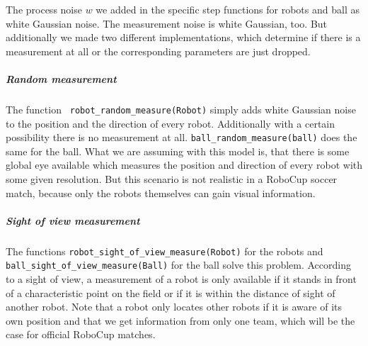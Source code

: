 The process noise $w$ we added in the specific step functions for robots and ball as white Gaussian noise.
The measurement noise is white Gaussian, too. But additionally we made two different implementations, which determine if there is a measurement at all or the corresponding parameters are just dropped.

\subparagraph{Random measurement}
The function \texttt{ robot\_random\_measure(Robot)} simply adds white Gaussian noise to the position and the direction of every robot. Additionally with a certain possibility there is no measurement at all.  \texttt{ball\_random\_measure(ball)} does the same for the ball. What we are assuming with this model is, that there is some global eye available which measures the position and direction of every robot with some given resolution. But this scenario is not realistic in a RoboCup soccer match, because only the robots themselves can gain visual information.

\subparagraph{Sight of view measurement} The functions \texttt{robot\_sight\_of\_view\_measure(Robot)} for the robots and \texttt{ball\_sight\_of\_view\_measure(Ball)} for the ball solve this problem. According to a sight of view, a measurement of a robot is only available if it stands in front of a characteristic point on the field or if it is within the distance of sight of another robot. Note that a robot only locates other robots if it is aware of its own position and that we get information from only one team, which will be the case for official RoboCup matches.







